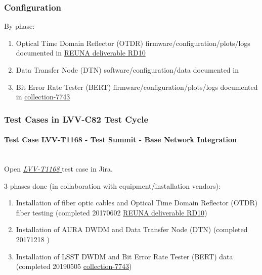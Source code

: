 \documentclass[DM,lsstdraft,STR,toc]{lsstdoc}
\providecommand{\tightlist}{
  \setlength{\itemsep}{0pt}\setlength{\parskip}{0pt}}
\begin{document}
  \subsubsection{Configuration}
    By phase:\\

\begin{enumerate}
\tightlist
\item
  Optical Time Domain Reflector (OTDR) firmware/configuration/plots/logs
  documented in
  \href{https://docushare.lsstcorp.org/docushare/dsweb/Get/Document-26270/RD10\%20Report\%20of\%20delivery\%20of\%20LS\%20-\%20AG\%20fiber\%20from\%20Telefonica\%20to\%20REUNA.pdf}{REUNA
  deliverable RD10}
\item
  Data Transfer Node (DTN) software/configuration/data documented in
\item
  Bit Error Rate Tester (BERT) firmware/configuration/plots/logs
  documented in
  \href{https://docushare.lsstcorp.org/docushare/dsweb/View/Collection-7743}{collection-7743}
\end{enumerate}


  \subsubsection{Test Cases in LVV-C82 Test Cycle}


    \paragraph{Test Case LVV-T1168 - Test Summit - Base Network Integration
 }\mbox{}\\

Open  \href{https://jira.lsstcorp.org/secure/Tests.jspa#/testCase/LVV-T1168}{\textit{ LVV-T1168 } }
test case in Jira.

    3 phases done (in collaboration with equipment/installation vendors):

\begin{enumerate}
\tightlist
\item
  Installation of fiber optic cables and Optical Time Domain Reflector
  (OTDR) fiber testing (completed 20170602
  \href{https://docushare.lsstcorp.org/docushare/dsweb/Get/Document-26270/RD10\%20Report\%20of\%20delivery\%20of\%20LS\%20-\%20AG\%20fiber\%20from\%20Telefonica\%20to\%20REUNA.pdf}{REUNA
  deliverable RD10})
\item
  Installation of AURA DWDM and Data Transfer Node (DTN) (completed
  20171218 )
\item
  Installation of LSST DWDM and Bit Error Rate Tester (BERT) data
  (completed 20190505
  \href{https://docushare.lsstcorp.org/docushare/dsweb/View/Collection-7743}{collection-7743})
\end{enumerate}
\end{document}
